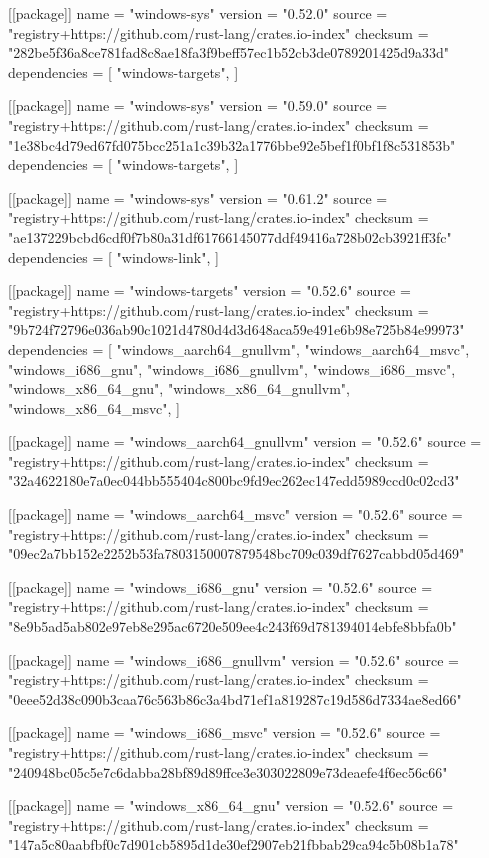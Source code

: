 [[package]]
name = "windows-sys"
version = "0.52.0"
source = "registry+https://github.com/rust-lang/crates.io-index"
checksum = "282be5f36a8ce781fad8c8ae18fa3f9beff57ec1b52cb3de0789201425d9a33d"
dependencies = [
 "windows-targets",
]

[[package]]
name = "windows-sys"
version = "0.59.0"
source = "registry+https://github.com/rust-lang/crates.io-index"
checksum = "1e38bc4d79ed67fd075bcc251a1c39b32a1776bbe92e5bef1f0bf1f8c531853b"
dependencies = [
 "windows-targets",
]

[[package]]
name = "windows-sys"
version = "0.61.2"
source = "registry+https://github.com/rust-lang/crates.io-index"
checksum = "ae137229bcbd6cdf0f7b80a31df61766145077ddf49416a728b02cb3921ff3fc"
dependencies = [
 "windows-link",
]

[[package]]
name = "windows-targets"
version = "0.52.6"
source = "registry+https://github.com/rust-lang/crates.io-index"
checksum = "9b724f72796e036ab90c1021d4780d4d3d648aca59e491e6b98e725b84e99973"
dependencies = [
 "windows_aarch64_gnullvm",
 "windows_aarch64_msvc",
 "windows_i686_gnu",
 "windows_i686_gnullvm",
 "windows_i686_msvc",
 "windows_x86_64_gnu",
 "windows_x86_64_gnullvm",
 "windows_x86_64_msvc",
]

[[package]]
name = "windows_aarch64_gnullvm"
version = "0.52.6"
source = "registry+https://github.com/rust-lang/crates.io-index"
checksum = "32a4622180e7a0ec044bb555404c800bc9fd9ec262ec147edd5989ccd0c02cd3"

[[package]]
name = "windows_aarch64_msvc"
version = "0.52.6"
source = "registry+https://github.com/rust-lang/crates.io-index"
checksum = "09ec2a7bb152e2252b53fa7803150007879548bc709c039df7627cabbd05d469"

[[package]]
name = "windows_i686_gnu"
version = "0.52.6"
source = "registry+https://github.com/rust-lang/crates.io-index"
checksum = "8e9b5ad5ab802e97eb8e295ac6720e509ee4c243f69d781394014ebfe8bbfa0b"

[[package]]
name = "windows_i686_gnullvm"
version = "0.52.6"
source = "registry+https://github.com/rust-lang/crates.io-index"
checksum = "0eee52d38c090b3caa76c563b86c3a4bd71ef1a819287c19d586d7334ae8ed66"

[[package]]
name = "windows_i686_msvc"
version = "0.52.6"
source = "registry+https://github.com/rust-lang/crates.io-index"
checksum = "240948bc05c5e7c6dabba28bf89d89ffce3e303022809e73deaefe4f6ec56c66"

[[package]]
name = "windows_x86_64_gnu"
version = "0.52.6"
source = "registry+https://github.com/rust-lang/crates.io-index"
checksum = "147a5c80aabfbf0c7d901cb5895d1de30ef2907eb21fbbab29ca94c5b08b1a78"

